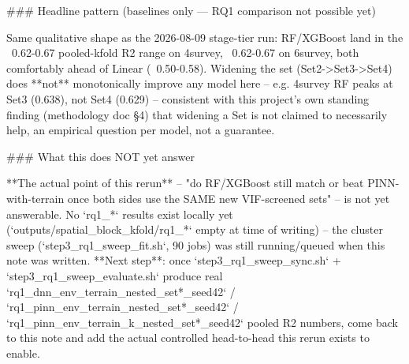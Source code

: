 ### Headline pattern (baselines only — RQ1 comparison not possible yet)

Same qualitative shape as the 2026-08-09 stage-tier run: RF/XGBoost land in the ~0.62-0.67
pooled-kfold R2 range on 4survey, ~0.62-0.67 on 6survey, both comfortably ahead of Linear
(~0.50-0.58). Widening the set (Set2->Set3->Set4) does **not** monotonically improve any model
here -- e.g. 4survey RF peaks at Set3 (0.638), not Set4 (0.629) -- consistent with this
project's own standing finding (methodology doc §4) that widening a Set is not claimed to
necessarily help, an empirical question per model, not a guarantee.

### What this does NOT yet answer

**The actual point of this rerun** -- "do RF/XGBoost still match or beat PINN-with-terrain once
both sides use the SAME new VIF-screened sets" -- is not yet answerable. No `rq1_*` results
exist locally yet (`outputs/spatial_block_kfold/rq1_*` empty at time of writing) -- the cluster
sweep (`step3_rq1_sweep_fit.sh`, 90 jobs) was still running/queued when this note was written.
**Next step**: once `step3_rq1_sweep_sync.sh` + `step3_rq1_sweep_evaluate.sh` produce real
`rq1_dnn_env_terrain_nested_set*_seed42` / `rq1_pinn_env_terrain_nested_set*_seed42` /
`rq1_pinn_env_terrain_k_nested_set*_seed42` pooled R2 numbers, come back to this note and add
the actual controlled head-to-head this rerun exists to enable.
